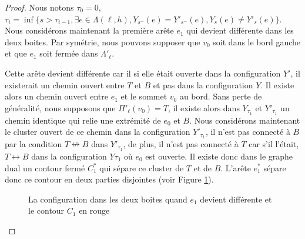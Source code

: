 \documentclass[titlepage,a4paper,12pt]{article}
\newcounter{cor}
\begin{document}
\begin{proof}
Nous notons $\tau_0 = 0$, $\tau_i = \inf \{s > \tau_{i-1}, \exists e \in \Lambda(\ell,h),Y_{s^-}(e) = Y'_{s^-}(e),Y_s(e) \neq Y'_s(e)\}$. Nous considérons maintenant la première arête $e_1$ qui devient différente dans les deux boites. Par symétrie, nous pouvons supposer que $v_0$ soit dans le bord gauche et que $e_1$ soit fermée dans $\Lambda'_\ell$.

Cette arête devient différente car il si elle était ouverte dans la configuration $Y'$, il existerait un chemin ouvert entre $T$ et $B$ et pas dans la configuration $Y$. Il existe alors un chemin ouvert entre $e_1$ et le sommet $v_0$ au bord. Sans perte de généralité, nous supposons que $\Pi'_\ell(v_0)=T$, il existe alors dans $Y_{\tau_1}$ et $Y'_{\tau_1}$ un chemin identique qui relie une extrémité de $e_0$ et $B$. Nous considérons maintenant le cluster ouvert de ce chemin dans la configuration $Y'_{\tau_1}$, il n'est pas connecté à $B$ par la condition $T\nleftrightarrow B$ dans $Y'_{\tau_1}$, de plus, il n'est pas connecté à $T$ car s'il l'était, $T\longleftrightarrow B$ dans la configuration $Y{\tau_1}$ où $e_0$ est ouverte. Il existe donc dans le graphe dual un contour fermé $C^*_1$ qui sépare ce cluster de $T$ et de $B$. L'arête $e^*_1$ sépare donc ce contour en deux parties disjointes (voir Figure \ref{fig:e1}). 
\begin{figure}[h]
\begin{minipage}{0.45\linewidth}
\center
{}
\end{minipage}
\begin{minipage}{0.45\linewidth}
\center
{}
\end{minipage}
\caption{La configuration dans les deux boites quand $e_1$ devient différente et le contour $C_1$ en rouge}
\label{fig:e1}
\end{figure}


\end{proof}
\end{document}
